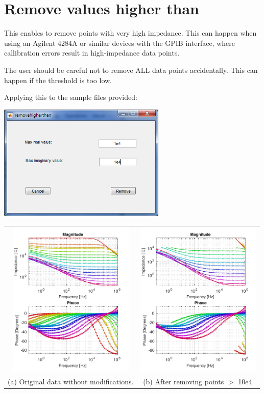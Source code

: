 \documentclass[10pt,b5paper,oneside]{book}
\begin{document}
\section{Remove values higher than}

This enables to remove points with very high impedance. This can happen when using an Agilent 4284A or similar devices with the GPIB interface, where callibration errors result in high-impedance data points.

The user should be careful not to remove ALL data points accidentally. This can happen if the threshold is too low.

Applying this to the sample files provided:

\includegraphics[width=8cm]{hvremove2.png}

\begin{tabular}{cc}
	\includegraphics[width=6cm]{hvremove1.pdf} & \includegraphics[width=6cm]{hvremove3.pdf} \\
	(a) Original data without modifications. & (b) After removing points $>$ 10e4. \\
\end{tabular}
\end{document}
